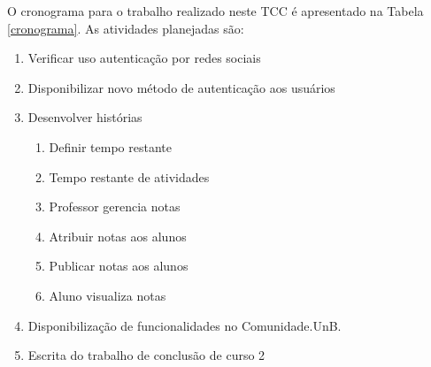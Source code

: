 O cronograma para o trabalho realizado neste TCC é apresentado na Tabela \ref{cronograma}. As atividades planejadas são:

\begin{enumerate}
\item Verificar uso autenticação por redes sociais
\item Disponibilizar novo método de autenticação aos usuários
\item Desenvolver histórias
\begin{enumerate}
\item Definir tempo restante
\item Tempo restante de atividades
\item Professor gerencia notas
\item Atribuir notas aos alunos
\item Publicar notas aos alunos
\item Aluno visualiza notas
\end{enumerate}
\item Disponibilização de funcionalidades no Comunidade.UnB.
\item Escrita do trabalho de conclusão de curso 2
\end{enumerate}

